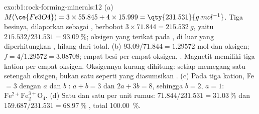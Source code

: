 \begin{solution}{exo:b1:rock-forming-minerals:12}
(a) $M(\ce{Fe3O4}) = 3\times55.845 + 4\times15.999 = \qty{231.531}{g.mol^{-1}}$.
Tiga besinya, dilaporkan sebagai , berbobot $3\times71.844 = \qty{215.532}{g}$,
yaitu $215.532/231.531 = \qty{93.09}{\percent}$; oksigen yang terikat pada
, di luar yang diperhitungkan , hilang dari total.
(b) $93.09/71.844 = 1.29572$ mol  dan oksigen; $f =
4/1.29572 = 3.08708$; empat besi per empat oksigen, . Magnetit memiliki
tiga kation per empat oksigen. Oksigennya kurang dihitung: setiap
 memegang satu setengah oksigen, bukan satu seperti yang diasumsikan . (c) Pada tiga kation, Fe $= 3$
dengan $a$  dan $b$ : $a + b = 3$ dan $2a + 3b = 8$,
sehingga $b = 2$, $a = 1$: $\mathrm{Fe^{2+}Fe^{3+}_2O_4}$. (d) Satu  dan
satu  per unit rumus: $71.844/231.531 = \qty{31.03}{\percent}$
 dan $159.687/231.531 = \qty{68.97}{\percent}$ , total
\qty{100.00}{\percent}.
\end{solution}

